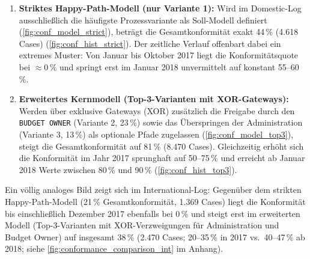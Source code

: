 \begin{enumerate}[noitemsep]
    \item \textbf{Striktes Happy-Path-Modell (nur Variante 1):} Wird im Domestic-Log ausschließlich die häufigste Prozessvariante als Soll-Modell definiert (\autoref{fig:conf_model_strict}), beträgt die Gesamtkonformität exakt 44\,\% (4.618 Cases) (\autoref{fig:conf_hist_strict}). Der zeitliche Verlauf offenbart dabei ein extremes Muster: Von Januar bis Oktober 2017 liegt die Konformitätsquote bei $\approx 0\,\%$ und springt erst im Januar 2018 unvermittelt auf konstant 55--60\,\%.
    \item \textbf{Erweitertes Kernmodell (Top-3-Varianten mit XOR-Gateways):} Werden über exklusive Gateways (XOR) zusätzlich die Freigabe durch den \texttt{BUDGET OWNER} (Variante 2, 23\,\%) sowie das Überspringen der Administration (Variante 3, 13\,\%) als optionale Pfade zugelassen (\autoref{fig:conf_model_top3}), steigt die Gesamtkonformität auf 81\,\% (8.470 Cases). Gleichzeitig erhöht sich die Konformität im Jahr 2017 sprunghaft auf 50--75\,\% und erreicht ab Januar 2018 Werte zwischen 80\,\% und 90\,\% (\autoref{fig:conf_hist_top3}).
\end{enumerate}

Ein völlig analoges Bild zeigt sich im International-Log: Gegenüber dem strikten Happy-Path-Modell (21\,\% Gesamtkonformität, 1.369 Cases) liegt die Konformität bis einschließlich Dezember 2017 ebenfalls bei 0\,\% und steigt erst im erweiterten Modell (Top-3-Varianten mit XOR-Verzweigungen für Administration und Budget Owner) auf insgesamt 38\,\% (2.470 Cases; 20--35\,\% in 2017 vs.\ 40--47\,\% ab 2018; siehe \autoref{fig:conformance_comparison_int} im Anhang).


